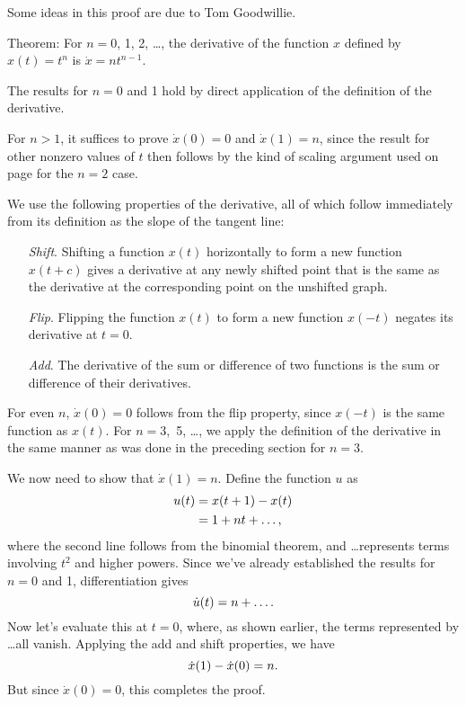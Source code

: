 \pagebreak

Some ideas in this proof are due to Tom Goodwillie.

Theorem: For $n=0$, 1, 2, \ldots, the derivative of the function $x$ defined by
$x(t)=t^n$ is $\dot{x}=nt^{n-1}$.

The results for $n=0$ and 1 hold by direct application of the definition of the derivative.

For $n>1$, it suffices to
prove $\dot{x}(0)=0$ and $\dot{x}(1)=n$, since the result for other
nonzero values of $t$ then follows by the kind of scaling argument
used on page \pageref{scaling} for the $n=2$ case.

We use the following properties of the derivative, all of which follow immediately from its
definition as the slope of the tangent line:

\begin{itemize}
\item[\emph{Shift}.] Shifting a function $x(t)$ horizontally to form a new function $x(t+c)$ gives a derivative
         at any newly shifted point that is the same as the derivative at the corresponding point on the unshifted graph.
\item[\emph{Flip}.] Flipping the function $x(t)$ to form a new function $x(-t)$ negates
         its derivative at $t=0$.
\item[\emph{Add}.] The derivative of the sum or difference of two functions is the sum or difference of their derivatives.
\end{itemize}

For even $n$, $\dot{x}(0)=0$ follows from the flip property, since $x(-t)$ is the same function as $x(t)$.
For $n=3,$ 5, \ldots, we apply the definition of the derivative in the same manner as was done in the preceding
section for $n=3$.

We now need to show that $\dot{x}(1)=n$. Define the function $u$ as
\begin{align*}
  u(t) &= x(t+1)-x(t) \\
       &= 1+nt + \ldots,
\end{align*}
where the second line follows from the binomial theorem, and \ldots represents terms involving $t^2$ and
higher powers. Since we've already established the results for $n=0$ and 1,
differentiation gives
\begin{equation*}
  \dot{u}(t) = n + \ldots.
\end{equation*}
Now let's evaluate this at $t=0$, where, as shown earlier, the terms represented by \ldots all vanish.
Applying the add and shift properties, we have
\begin{equation*}
  \dot{x}(1)-\dot{x}(0) = n.
\end{equation*}
But since $\dot{x}(0)=0$, this completes the proof.

